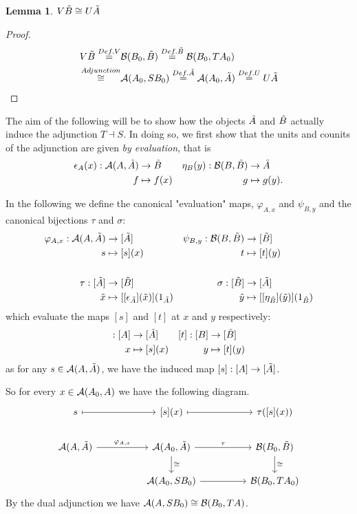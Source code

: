 \documentclass[12pt,a4paper]{article}
\newtheorem{lemma}{Lemma}[section] %
\def\HomA{\ensuremath\mathcal{A}}
\def\HomB{\ensuremath\mathcal{B}}
\def\t{\ensuremath\tilde}
\begin{document}
\begin{lemma}
	$V \t B \cong U \t A$
\end{lemma}
\begin{proof}
	\begin{align*}
		V \t B \stackrel{Def. V}{=}& \HomB(B_0,\t B) \stackrel{Def. \t B}{=} \HomB(B_0, TA_0)\\ \stackrel{Adjunction}{\cong}& \HomA(A_0,SB_0) \stackrel{Def. \t A}{=}\HomA(A_0,\t A) \stackrel{Def. U}{=} U\t A
	\end{align*} 
	\end{proof}
	
	The aim of the following will be to show how the objects $\t A$ and $\t B$ actually induce the adjunction $T \dashv S$. In doing so, we first show that the units and counits of the adjunction are given \emph{by evaluation}, that is \begin{align*}
		\epsilon_A(x): \HomA(A, \t A) &\to \t B& \eta_B(y) : \HomB(B, \t 
		B) &\to \t A\\
		f & \mapsto f(x)& g &\mapsto g(y).
	\end{align*}
	
	In the following we define the canonical "evaluation" maps, $\varphi_{A, x}$ and $\psi_{B, y}$ and the canonical bijections $\tau$ and $\sigma$:  
\begin{align*}
	\varphi_{A, x} : \HomA(A, \t A) &\to [\t A ]& \psi_{B, y} : \HomB(B, \t B) &\to [\t B ]\\
	 s &\mapsto [s](x) &t &\mapsto [t](y) \\\\
	 \tau: [\t A] &\to [\t B]&\sigma: [\t B] &\to [\t A]\\
	 \t x &\mapsto  [[\epsilon_{\t A}](\t x)](1_{\t A})&\t y &\mapsto  [[\eta_{\t B}](\t y)](1_{\t B})
\end{align*}
which evaluate the maps $[s]$ and $[t]$ at $x$ and $y$ respectively:
\begin{align*}
	[s]: [A] &\to [\t A]&[t]: [B] &\to [\t B]\\
	x &\mapsto [s](x)& y &\mapsto [t](y)
\end{align*}
as for any $s \in \HomA(A, \t A) $, we have the induced map $[s]: [A] \to [\t A]$.

So for every $x \in \HomA(A_0,  A)$ we have the following diagram.
\[\begin{tikzcd}
	s && {[s](x)} && {\tau([s](x))} \\
	\HomA(A, \t A) && \HomA(A_0, \t A) && \HomB(B_0, \t B) \\
	&& \HomA(A_0, SB_0) && \HomB(B_0, TA_0)
	\arrow[maps to, from=1-1, to=1-3]
	\arrow[maps to, from=1-3, to=1-5]
	\arrow["\varphi_{A,x}", from=2-1, to=2-3]
	\arrow["\tau", from=2-3, to=2-5]
	\arrow["\cong",from=2-3, to=3-3]
	\arrow["\cong",from=2-5, to=3-5]
	\arrow[from=3-3, to=3-5]
\end{tikzcd}\]
By the dual adjunction we have $\HomA(A, SB_0) \cong \HomB(B_0, TA)$.
\end{document}
